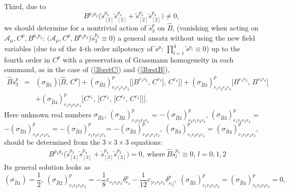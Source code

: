 \documentclass[10pt]{article}
\begin{document}
Third, due to
\begin{equation}\label{consistB}
B^{p_1p_2}\big(\overleftarrow{s}{}^{p_3}_{[2]}\overleftarrow{s}{}^{p_4}_{[2]}
+\overleftarrow{s}{}^{p_4}_{[2]}\overleftarrow{s}{}^{p_3}_{[2]}\big) \ne 0,
\end{equation}
we should determine for a nontrivial action of $\overleftarrow{s}{}^{p}_3$ on $\widehat{B}$, (vanishing when acting on $\mathcal{A}_\mu, C^p, B^{p_1p_2}$: $\big(\mathcal{A}_\mu,C^p, B^{p_1p_2}\big)\overleftarrow{s}{}^{p_3}_{3} \equiv 0$)
 a general ansatz without using the new field variables
(due to of the $4$-th order nilpotency of $\overleftarrow{s}{}^{p}$:  $\prod_{l=1}^4\overleftarrow{s}{}^{p_l}\equiv 0$)
up to the fourth order in $C^p$ with a preservation of Grassmann homogeneity
in each summand, as in the case of (\ref{3brstC}) and (\ref{3brstB}),
\begin{eqnarray}
 \widehat{B} \overleftarrow{s}{}^p_3 & = &  (\sigma_{\widehat{B}1}) \big[\widehat{B},\,C^p\big]+ (\sigma_{\widehat{B}2})^{p}_{r_1r_2r_3r_4}  \big[\big[B^{r_1r_2},\,C^{r_3}\big],\,C^{r_4}\big]\big]+(\sigma_{\widehat{B}3})^{p}_{r_1r_2r_3r_4}  \big[B^{r_1r_2},\,B^{r_3r_4}\big] \nonumber \\
  &&  +(\sigma_{\widehat{B}4})^{p}_{r_1r_2r_3r_4}  \big[C^{r_1},\,\big[C^{r_2},\,\big[C^{r_3},\,C^{r_4}\big]\big]\big]  .\label{3brsthB}
\end{eqnarray}
Here   unknown real numbers $\sigma_{\widehat{B}1}$,
$ (\sigma_{\widehat{B}2})^{p}_{r_1r_2r_3r_4}$ = $-(\sigma_{\widehat{B}2})^{p}_{r_2r_1r_3r_4} $,
$(\sigma_{\widehat{B}3})^{p}_{r_1r_2r_3r_4}$ = $-(\sigma_{\widehat{B}3})^{p}_{r_2r_1r_3r_4}=
-(\sigma_{\widehat{B}3})^{p}_{r_1r_2r_4r_3}$= $- (\sigma_{\widehat{B}3})^{p}_{r_3r_4r_1r_2} $,
$(\sigma_{\widehat{B}4})^{p}_{r_1r_2r_3r_4}$ = $(\sigma_{\widehat{B}4})^{p}_{r_1r_2r_4r_3}$,
should be determined from the $3\times3\times 3$ equations:
\begin{eqnarray}\label{consistBa}
&&  B^{p_1p_2}\big(\overleftarrow{s}{}^{p_3}_{[3]}\overleftarrow{s}{}^{p_4}_{[3]}+\overleftarrow{s}{}^{p_4}_{[3]}\overleftarrow{s}{}^{p_3}_{[3]}\big) =0, \ \mathrm{where} \ \widehat{B}\overleftarrow{s}{}^{p_3}_{l}\equiv 0,\,  l=0,1,2 \end{eqnarray}
Its general  solution looks as
\begin{equation}\label{solconstB}
  (\sigma_{\widehat{B}1}) = \frac{1}{2}, \  (\sigma_{\widehat{B}2})^{p}_{r_1r_2r_3r_4} = -\frac{1}{8}\varepsilon_{r_1r_2r_3}\delta^p_{r_4} -  \frac{1}{12}\varepsilon_{[r_1r_3r_4}\delta^p_{r_2]}, \ (\sigma_{\widehat{B}3})^{p}_{r_1r_2r_3r_4} = (\sigma_{\widehat{B}4})^{p}_{r_1r_2r_3r_4} =0,
\end{equation}
\end{document}
